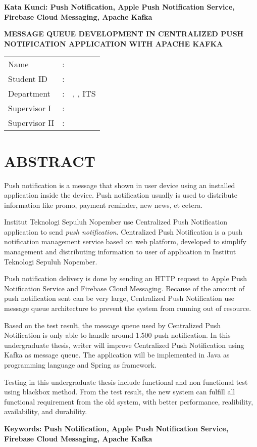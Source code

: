 \vspace*{1em}
\noindent\bfseries Kata Kunci: Push Notification, Apple Push Notification Service, Firebase Cloud Messaging, Apache Kafka
\normalfont
\cleardoublepage

\begin{center}
	\noindent\textbf{\MakeUppercase{Message Queue Development in Centralized Push Notification Application with Apache Kafka}}
\end{center}
\vspace*{1em}

\noindent\begin{tabularx}{\linewidth}{l l X}
	Name 			& : & \penulis \\
	Student ID		& :	& \nrp \\
	Department 		& : & \jurusaneng, \newline \fakultaseng, ITS \\
	Supervisor I 	& : & \pembimbingsatu \\
	Supervisor II 	& : & \pembimbingdua
\end {tabularx}

{\let\clearpage\relax\titlespacing{\chapter}{0em}{0em}{1em} \chapter{ABSTRACT}}
\itshape
\par Push notification is a message that shown in user device using an installed application inside the device. Push notification usually is used to distribute information like promo, payment reminder, new news, et cetera.
\par Institut Teknologi Sepuluh Nopember use Centralized Push Notification application to send \textit{push notification}. Centralized Push Notification is a push notification management service based on web platform, developed to simplify management and distributing information to user of application in Institut Teknologi Sepuluh Nopember.
\par Push notification delivery is done by sending an HTTP request to Apple Push Notification Service and Firebase Cloud Messaging. Because of the amount of push notification sent can be very large, Centralized Push Notification use message queue architecture to prevent the system from running out of resource.
\par Based on the test result, the message queue used by Centralized Push Notification is only able to handle around 1.500 push notification. In this undergraduate thesis, writer will improve Centralized Push Notification using Kafka as message queue. The application will be implemented in Java as programming language and Spring as framework.
\par Testing in this undergraduate thesis include functional and non functional test using blackbox method. From the test result, the new system can fulfill all functional requirement from the old system, with better performance, realibility, availability, and durability.

\vspace*{1em}
\noindent\bfseries Keywords: Push Notification, Apple Push Notification Service, Firebase Cloud Messaging, Apache Kafka
\normalfont
\cleardoublepage